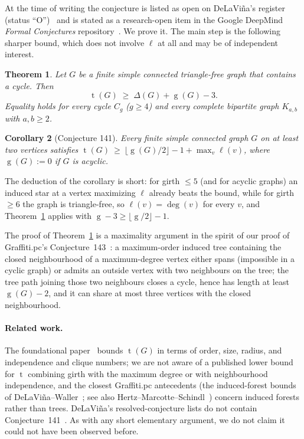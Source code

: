 \documentclass[11pt]{article}
\numberwithin{equation}{section}
\newtheorem{theorem}{Theorem}[section]
\newtheorem{corollary}[theorem]{Corollary}
\theoremstyle{remark}
\newcommand{\tr}{\operatorname{t}}
\newcommand{\gr}{\operatorname{g}}
\newcommand{\lv}{\ell}
\begin{document}
At the time of writing the conjecture is listed as open on DeLaVi\~na's
register (status ``O'')~\cite{WOWII} and is stated as a research-open item in
the Google DeepMind \emph{Formal Conjectures} repository~\cite{FC,FC141}.  We
prove it.
The main step is the following sharper bound, which does not involve
$\lv$ at all and may be of independent interest.

\begin{theorem}\label{thm:main}
Let $G$ be a finite simple connected triangle-free graph that contains a
cycle.  Then
\[
  \tr(G)\;\ge\;\Delta(G)+\gr(G)-3 .
\]
Equality holds for every cycle $C_g$ ($g\ge4$) and every complete bipartite
graph $K_{a,b}$ with $a,b\ge2$.
\end{theorem}

\begin{corollary}[Conjecture 141]\label{cor:141}
Every finite simple connected graph $G$ on at least two vertices satisfies
$\tr(G)\ \ge\ \lfloor \gr(G)/2\rfloor - 1 + \max_v \lv(v)$, where
$\gr(G):=0$ if $G$ is acyclic.
\end{corollary}

The deduction of the corollary is short: for girth $\le5$ (and for acyclic
graphs) an induced star at a vertex maximizing $\lv$ already beats the bound,
while for girth $\ge6$ the graph is triangle-free, so $\lv(v)=\deg(v)$ for
every $v$, and Theorem~\ref{thm:main} applies with
$\gr-3\ge\lfloor\gr/2\rfloor-1$.

The proof of Theorem~\ref{thm:main} is a maximality argument in the spirit of
our proof of Graffiti.pc's Conjecture~143~\cite{W143}: a maximum-order induced
tree containing the closed neighbourhood of a maximum-degree vertex either
spans (impossible in a cyclic graph) or admits an outside vertex with two
neighbours on the tree; the tree path joining those two neighbours closes a
cycle, hence has length at least $\gr(G)-2$, and it can share at most three
vertices with the closed neighbourhood.

\paragraph{Related work.}
The foundational paper~\cite{ESS86} bounds $\tr(G)$ in terms of order, size,
radius, and independence and clique numbers; we are not aware of a published
lower bound for $\tr$ combining girth with the maximum degree or with
neighbourhood independence, and the closest Graffiti.pc antecedents (the
induced-forest bounds of DeLaVi\~na--Waller~\cite{DW04}; see also
Hertz--Marcotte--Schindl~\cite{HMS14}) concern induced forests rather than
trees.  DeLaVi\~na's resolved-conjecture lists do not contain
Conjecture~141~\cite{WOWII}.  As with any short elementary argument, we do
not claim it could not have been observed before.
\end{document}
